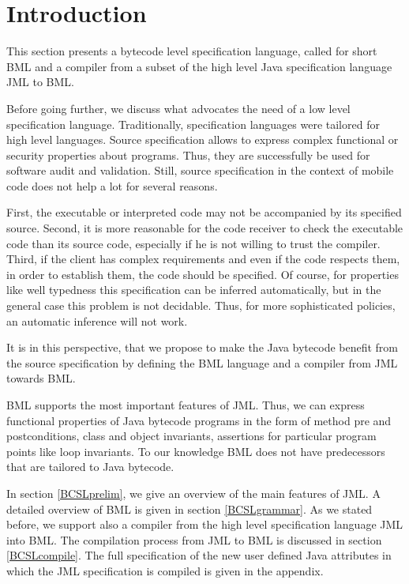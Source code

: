 
%

\newcommand{\code}{\textit{code}}
\newcommand{\indexComp}{\textit{index}}





\section{Introduction} \label{bcsl}
This section presents a bytecode level specification language, called for short BML and a compiler from a
 subset of the high level Java specification language JML to BML. 


 Before going further, we discuss what advocates the need of a low level specification language.
Traditionally, specification languages were tailored for high level languages.  
Source  specification allows to express complex functional or security properties about programs.
Thus, they are successfully be used 
for software audit and validation. Still, source specification in the context of mobile code does not help a lot for several reasons.


First, the executable or interpreted code  may not be accompanied by its specified  source. Second, it is more reasonable for the 
code receiver to check the executable code than its source code, especially if he is not willing to trust the compiler. 
Third, if the client has complex requirements and even if the code respects them, in order to establish them, 
the code should be specified. Of course, for properties like well typedness this specification can be inferred automatically,
but in the general case this problem is not decidable. 
Thus, for more sophisticated policies, an automatic inference will not work.

 It is in this perspective, that we propose to make the Java
bytecode benefit from the source specification by defining the BML language and a compiler from JML towards BML.    

 BML supports the most important features of JML. Thus, we can express functional properties of Java
 bytecode programs in the form of method pre and postconditions, class and object invariants, assertions
 for particular program points like loop invariants. To our knowledge BML does not have predecessors that are tailored 
 to Java bytecode.  

 In section \ref{BCSLprelim}, we give an overview of the main features of JML. A detailed overview of BML is given in section \ref{BCSLgrammar}.  
  As we stated before, we support also a compiler from the high level specification language JML into BML. The 
 compilation process from JML to BML is discussed in section  \ref{BCSLcompile}.
 The full specification of the new user defined Java attributes in which the JML specification is compiled is given in the appendix.




